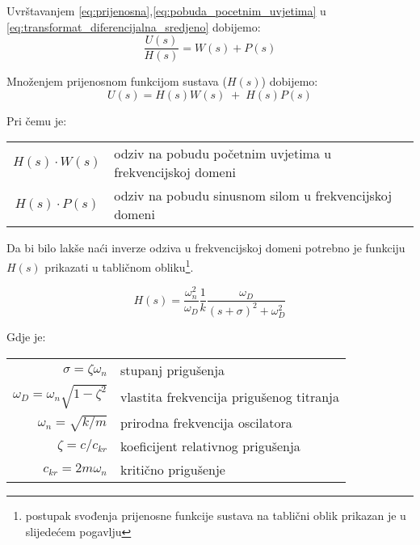 Uvrštavanjem \eqref{eq:prijenosna},\eqref{eq:pobuda_pocetnim_uvjetima} u 
\eqref{eq:transformat_diferencijalna_sredjeno} dobijemo:
\begin{equation*}
	\frac{U(s)}{H(s)}=W(s)+P(s)
\end{equation*}

Množenjem prijenosnom funkcijom sustava ($H(s)$) dobijemo:
\begin{equation}\label{eq:uk_rjesenje_freq}
    U(s) = H(s)W(s)\; + \; H(s)P(s)
\end{equation}

Pri čemu je:
\begin{table}[H]
\begin{tabular}{c l}
	$H(s)\cdot W(s)$ & odziv na pobudu početnim uvjetima u frekvencijskoj domeni\\
	$H(s)\cdot P(s)$ & odziv na pobudu sinusnom silom u frekvencijskoj domeni\\
\end{tabular}
\end{table}

\newpage
Da bi bilo lakše naći inverze odziva u frekvencijskoj domeni potrebno je funkciju  
$H(s)$ prikazati u tabličnom obliku\footnote{postupak svođenja prijenosne funkcije
sustava na tablični oblik prikazan je u slijedećem pogavlju}.

\begin{equation}\label{eq:pfs_tablicni_oblik}
    H(s) = \frac{\omega_n^2}{\omega_D}
           \frac{1}{k}
           \frac{\omega_D}{(s+\sigma)^2+\omega_D^2}
\end{equation}

Gdje je:\\
\begin{table}[H]
    \begin{tabular}{r l}
        $\sigma=\zeta\omega_n$ & stupanj prigušenja\\
        $\omega_D=\omega_n\sqrt{1-\zeta^2}$ & vlastita frekvencija prigušenog titranja\\
        $\omega_n=\sqrt{k/m}$ & prirodna frekvencija oscilatora\\
        $\zeta=c/c_{kr}$ & koeficijent relativnog prigušenja\\
        $c_{kr}=2m\omega_n$ & kritično prigušenje
    \end{tabular}
\end{table}

